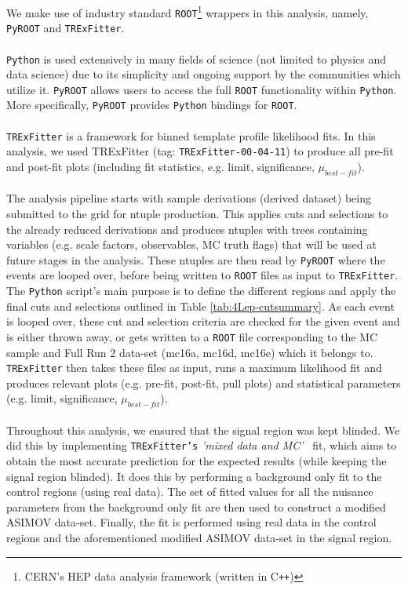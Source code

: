 We make use of industry standard \texttt{ROOT}\footnote{CERN's HEP data analysis framework (written in C\texttt{++})} wrappers in this analysis, namely, \texttt{PyROOT} and \texttt{TRExFitter}.\\\\
\texttt{Python} is used extensively in many fields of science (not limited to physics and data science) due to its simplicity and ongoing support by the communities which utilize it. \texttt{PyROOT} allows users to access the full \texttt{ROOT} functionality within \texttt{Python}. More specifically, \texttt{PyROOT} provides \texttt{Python} bindings for \texttt{ROOT}.\\\\
\texttt{TRExFitter} is a framework for binned template profile likelihood fits\cite{TRexfitter}. In this analysis, we used TRExFitter (tag: \texttt{TRExFitter-00-04-11}) to produce all pre-fit and post-fit plots (including fit statistics, e.g. limit, significance, $\mu_{best-fit}$).\\\\
The analysis pipeline starts with sample derivations (derived dataset) being submitted to the grid for ntuple production. This applies cuts and selections to the already reduced derivations and produces ntuples with trees containing variables (e.g. scale factors, observables, MC truth flags) that will be used at future stages in the analysis. These ntuples are then read by \texttt{PyROOT} where the events are looped over, before being written to \texttt{ROOT} files as input to \texttt{TRExFitter}. The \texttt{Python} script's main purpose is to define the different regions and apply the final cuts and selections outlined in Table \ref{tab:4Lep-cutsummary}. As each event is looped over, these cut and selection criteria are checked for the given event and is either thrown away, or gets written to a \texttt{ROOT} file corresponding to the MC sample and Full Run 2 data-set (mc16a, mc16d, mc16e) which it belongs to. \texttt{TRExFitter} then takes these files as input, runs a maximum likelihood fit and produces relevant plots (e.g. pre-fit, post-fit, pull plots) and statistical parameters (e.g. limit, significance, $\mu_{best-fit}$).\\\\
Throughout this analysis, we ensured that the signal region was kept blinded. We did this by implementing \texttt{TRExFitter's} \textit{'mixed data and MC'}~\cite{MixedDataAndMC_TRF} fit, which aims to obtain the most accurate prediction for the expected results (while keeping the signal region blinded). It does this by performing a background only fit to the control regions (using real data). The set of fitted values for all the nuisance parameters from the background only fit are then used to construct a modified ASIMOV data-set. Finally, the fit is performed using real data in the control regions and the aforementioned modified ASIMOV data-set in the signal region.








